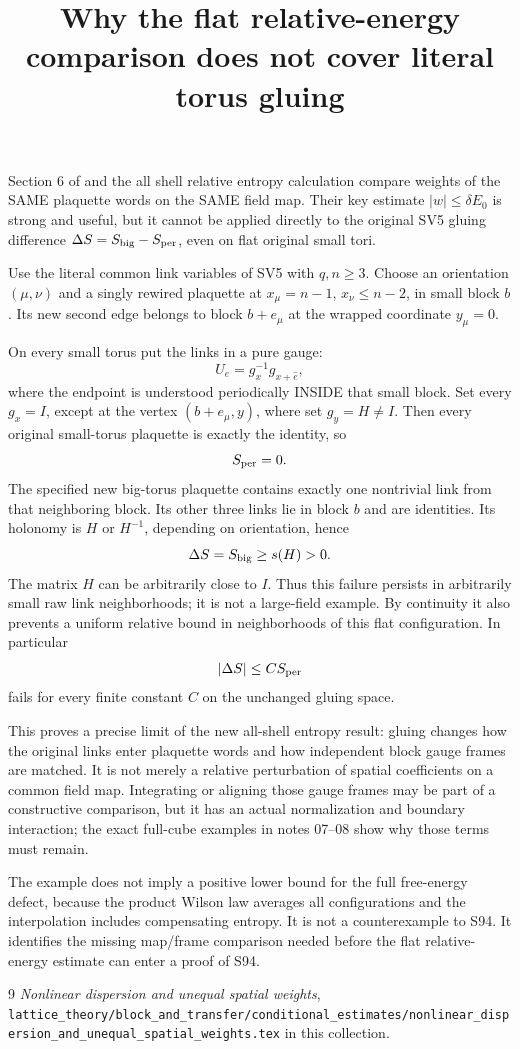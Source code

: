 \documentclass{article}
\title{Why the flat relative-energy comparison does not cover literal torus gluing}\author{}\date{}
\begin{document}
\maketitle
Section 6 of \cite{ND} and the all shell relative entropy calculation compare weights of the SAME plaquette words on the SAME field map. Their key estimate $|w|\leq\delta E_0$ is strong and useful, but it cannot be applied directly to the original SV5 gluing difference $\Delta S=S_{\rm big}-S_{\rm per}$, even on flat original small tori.

Use the literal common link variables of SV5 with $q,n\geq3$. Choose an orientation $(\mu,\nu)$ and a singly rewired plaquette at $x_\mu=n-1$, $x_\nu\leq n-2$, in small block $b$. Its new second edge belongs to block $b+e_\mu$ at the wrapped coordinate $y_\mu=0$.

On every small torus put the links in a pure gauge:
\[
 U_e=g_x^{-1}g_{x+\widehat e},
\]
where the endpoint is understood periodically INSIDE that small block. Set every $g_x=I$, except at the vertex $(b+e_\mu,y)$, where set $g_y=H\ne I$. Then every original small-torus plaquette is exactly the identity, so
\[
 S_{\rm per}=0.
\]
The specified new big-torus plaquette contains exactly one nontrivial link from that neighboring block. Its other three links lie in block $b$ and are identities. Its holonomy is $H$ or $H^{-1}$, depending on orientation, hence
\[
 \Delta S=S_{\rm big}\geq s(H)>0.
\]
The matrix $H$ can be arbitrarily close to $I$. Thus this failure persists in arbitrarily small raw link neighborhoods; it is not a large-field example. By continuity it also prevents a uniform relative bound in neighborhoods of this flat configuration. In particular
\[
 |\Delta S|\leq C S_{\rm per}
\]
fails for every finite constant $C$ on the unchanged gluing space.

This proves a precise limit of the new all-shell entropy result: gluing changes how the original links enter plaquette words and how independent block gauge frames are matched. It is not merely a relative perturbation of spatial coefficients on a common field map. Integrating or aligning those gauge frames may be part of a constructive comparison, but it has an actual normalization and boundary interaction; the exact full-cube examples in notes 07--08 show why those terms must remain.

The example does not imply a positive lower bound for the full free-energy defect, because the product Wilson law averages all configurations and the interpolation includes compensating entropy. It is not a counterexample to S94. It identifies the missing map/frame comparison needed before the flat relative-energy estimate can enter a proof of S94.
\begin{thebibliography}{9}
 \emph{Nonlinear dispersion and unequal spatial weights}, \texttt{lattice\_theory/block\_and\_transfer/conditional\_estimates/nonlinear\_dispersion\_and\_unequal\_spatial\_weights.tex} in this collection.
\end{thebibliography}
\end{document}
